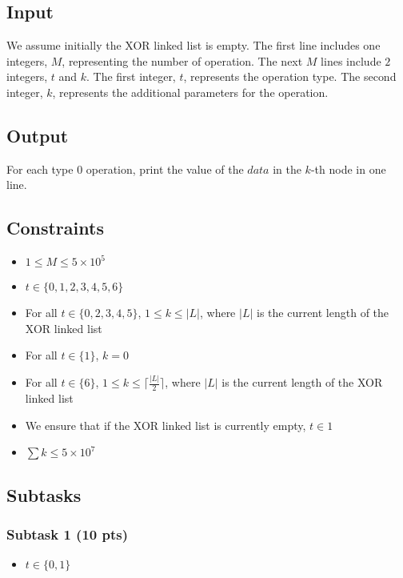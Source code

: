 \subsection{Input}\label{input}

We assume initially the XOR linked list is empty. The first line includes one integers, $M$, representing the number of operation. The next $M$ lines include $2$ integers, $t$ and $k$. The first integer, $t$, represents the operation type. The second integer, $k$, represents the additional parameters for the operation.

\subsection{Output}\label{output}

For each type $0$ operation, print the value of the $data$ in the $k$-th node in one line.

\subsection{Constraints}\label{constraint}

\begin{itemize}
    \item $1\leq M\leq 5\times 10^5$
    \item $t\in \{0, 1, 2, 3, 4, 5, 6\}$
    \item For all $t\in \{0, 2, 3, 4, 5\}$, $1\leq k\leq |L|$, where $|L|$ is the current length of the XOR linked list
    \item For all $t\in \{1\}$, $k=0$
    \item For all $t\in \{6\}$, $1\leq k\leq \lceil{\frac{|L|}{2}}\rceil$, where $|L|$ is the current length of the XOR linked list
    \item We ensure that if the XOR linked list is currently empty, $t\in 1$
    \item $\sum k\leq 5\times 10^7$
\end{itemize}

\subsection*{Subtasks}
\subsubsection{Subtask 1 (10 pts)}\label{subtask-1}
\begin{itemize}
\item $t\in \{0, 1\}$
\end{itemize}

